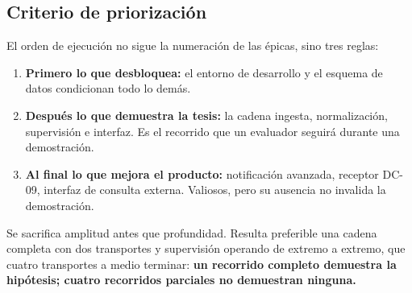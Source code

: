 \subsection{Criterio de priorización}

El orden de ejecución no sigue la numeración de las épicas, sino tres reglas:

\begin{enumerate}
\item \textbf{Primero lo que desbloquea:} el entorno de desarrollo y el esquema de datos condicionan
todo lo demás.
\item \textbf{Después lo que demuestra la tesis:} la cadena ingesta, normalización, supervisión e
interfaz. Es el recorrido que un evaluador seguirá durante una demostración.
\item \textbf{Al final lo que mejora el producto:} notificación avanzada, receptor DC-09, interfaz de
consulta externa. Valiosos, pero su ausencia no invalida la demostración.
\end{enumerate}

\begin{cajaclave}[title={Regla de decisión ante retraso}]
Se sacrifica amplitud antes que profundidad. Resulta preferible una cadena completa con dos transportes
y supervisión operando de extremo a extremo, que cuatro transportes a medio terminar: \textbf{un
recorrido completo demuestra la hipótesis; cuatro recorridos parciales no demuestran ninguna.}
\end{cajaclave}
